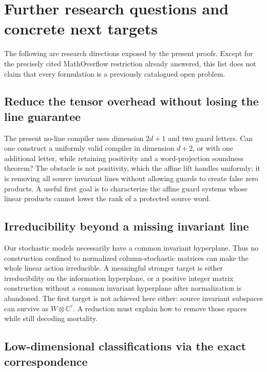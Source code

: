 \documentclass[11pt,letterpaper]{article}
\theoremstyle{definition}
\theoremstyle{remark}
\newcommand{\C}{\mathbb C}
\begin{document}
\section{Further research questions and concrete next targets}
\label{ste:ee:sec:questions}

The following are research directions exposed by the present proofs. Except for
the precisely cited MathOverflow restriction already answered, this list does
not claim that every formulation is a previously catalogued open problem.

\subsection{Reduce the tensor overhead without losing the line guarantee}\label{ste:ee:q:overhead}

The present no-line compiler uses dimension $2d+1$ and two guard letters. Can one
construct a uniformly valid compiler in dimension $d+2$, or with one additional
letter, while retaining positivity and a word-projection soundness theorem?
The obstacle is not positivity, which the affine lift handles uniformly; it is
removing all source invariant lines without allowing guards to create false
zero products. A useful first goal is to characterize the affine guard systems
whose linear products cannot lower the rank of a protected source word.

\subsection{Irreducibility beyond a missing invariant line}\label{ste:ee:q:irreducible}

Our stochastic models necessarily have a common invariant hyperplane. Thus no
construction confined to normalized column-stochastic matrices can make the
whole linear action irreducible. A meaningful stronger target is either
irreducibility on the information hyperplane, or a positive integer matrix
construction without a common invariant hyperplane after normalization is
abandoned. The first target is not achieved here either: source invariant
subspaces can survive as $W\otimes\C^r$. A reduction must explain how to remove
those spaces while still decoding mortality.

\subsection{Low-dimensional classifications via the exact correspondence}\label{ste:ee:q:lowdim}
\end{document}
